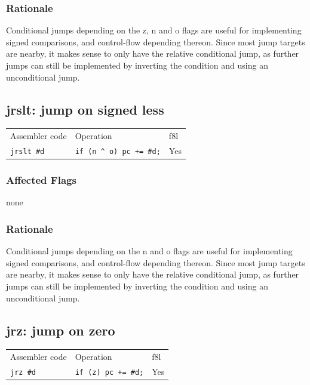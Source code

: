 \documentclass{book}
\begin{document}
\subsubsection*{Rationale}

Conditional jumps depending on the z, n and o flags are useful for implementing signed comparisons, and control-flow depending thereon. Since most jump targets are nearby, it makes sense to only have the relative conditional jump, as further jumps can still be implemented by inverting the condition and using an unconditional jump.


\subsection{jrslt: jump on signed less}

\begin{tabular}{l l l}
Assembler code     & Operation                         & f8l \\
\texttt{jrslt \#d} & \texttt{if (n \^{} o) pc += \#d;} & Yes \\
\end{tabular}

\subsubsection*{Affected Flags}

none

\subsubsection*{Rationale}

Conditional jumps depending on the n and o flags are useful for implementing signed comparisons, and control-flow depending thereon. Since most jump targets are nearby, it makes sense to only have the relative conditional jump, as further jumps can still be implemented by inverting the condition and using an unconditional jump.


\subsection{jrz: jump on zero}

\begin{tabular}{l l l}
Assembler code   & Operation                  & f8l \\
\texttt{jrz \#d} & \texttt{if (z) pc += \#d;} & Yes \\
\end{tabular}
\end{document}
